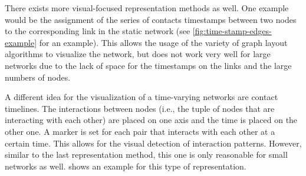 There exists more visual-focused representation methods as well.
One example would be the assignment of the series of contacts timestamps between two nodes to the corresponding link in the static network (see \cref{fig:time-stamp-edges-example} for an example).
This allows the usage of the variety of graph layout algorithms to visualize the network, but does not work very well for large networks due to the lack of space for the timestamps on the links and the large numbers of nodes.

A different idea for the visualization of a time-varying networks are contact timelines.
The interactions between nodes (i.e., the tuple of nodes that are interacting with each other) are placed on one axis and the time is placed on the other one.
A marker is set for each pair that interacts with each other at a certain time.
This allows for the visual detection of interaction patterns.
However, similar to the last representation method, this one is only reasonable for small networks as well.
 shows an example for this type of representation.


